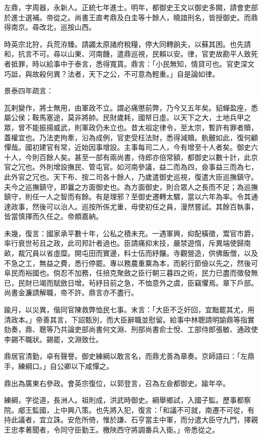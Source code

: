 \begin{pinyinscope}
左鼎，字周器，永新人。正統七年進士。明年，都御史王文以御史多闕，請會吏部於進士選補。帝從之。尚書王直考鼎及白圭等十餘人，曉諳刑名，皆授御史。而鼎得南京。尋改北，巡按山西。

時英宗北狩，兵荒洊臻。請蠲太原諸府稅糧，停大同轉餉夫，以蘇其困。也先請和，抗言不可。尋以山東、河南饑，遣鼎巡視，民賴以安。律，官吏故勘平人致死者抵罪，時以給事中于泰言，悉得寬貰。鼎言：「小民無知，情貸可也。官吏深文巧詆，與故殺何異？法者，天下之公，不可意為輕重。」自是論如律。

景泰四年疏言：

瓦剌變作，將士無用，由軍政不立。謂必痛懲前弊，乃今又五年矣。貂蟬盈座，悉屬公侯；鞍馬塞途，莫非將帥。民財歲耗，國帑日虛。以天下之大，土地兵甲之眾，曾不能振揚威武，則軍政仍未立也。昔太祖定律令，至太宗，暫許有罪者贖，蓋權宜也。乃法吏拘牽，沿為成例，官吏受枉法財，悉得減贖。骫骳如此，復何顧憚哉。國初建官有常，近始因事增設。主事每司二人，今有增至十人者矣。御史六十人，今則百餘人矣。甚至一部有兩尚書，侍郎亦倍常額，都御史以數十計，此京官之冗也。外則增設撫民、管屯官。如河南參議，益二而為四，僉事益三而為七，此外官之冗也。天下布、按二司各十餘人，乃歲遣御史巡視，復遣大臣巡撫鎮守。夫今之巡撫鎮守，即曩之方面御史也。為方面御史，則合眾人之長而不足；為巡撫鎮守，則任一人之智而有餘。有是理邪？至御史遷轉太驟，當以六年為率。令其通達政事，然後可以治人。巡按所係尤重，毋使初任之員，漫然嘗試。其餘百執事，皆當慎擇而久任之。帝頗嘉納。

未幾，復言：國家承平數十年，公私之積未充。一遇軍興，抑配橫徵，鬻官市爵，率行衰世茍且之政，此司邦計者過也。臣請痛抑末技，嚴禁遊惰，斥異端使歸南畝，裁冗員以省虛糜。開屯田而實邊，料士伍而紓饟。寺觀營造，供佛飯僧，以及不急之工，無益之費，悉行停罷。專以務農重粟為本，而躬行節儉以先之，然後可阜民而裕國也。倘忍不加務，任掊克聚斂之臣行朝三暮四之術，民力已盡而徵發無已，民財已竭而賦斂日增。茍紓目前之急，不恤意外之虞，臣竊懼焉。章下戶部。尚書金濂請解職，帝不許。鼎言亦不盡行。

踰月，以災異，偕同官陳救弊恤民七事。末言：「大臣不乏奸回，宜黜罷其尤，用清政本。」帝善其言，下詔甄別，而大臣辭職並慰留。給事中林聰請明諭鼎等指實劾奏，鼎、聰等乃共論吏部尚書何文淵、刑部尚書俞士悅、工部侍郎張敏、通政使李錫不職狀。錫罷，文淵致仕。

鼎居官清勤，卓有聲譽。御史練綱以敢言名，而鼎尤善為章奏。京師語曰：「左鼎手，練綱口。」自公卿以下咸憚之。

鼎出為廣東右參政。會英宗復位，以郭登言，召為左僉都御史。踰年卒。

練綱，字從道，長洲人。祖則成，洪武時御史。綱舉鄉試，入國子監。歷事都察院。郕王監國，上中興八策。也先將入犯，復言：「和議不可就，南遷不可從，有持此議者，宜立誅。安危所倚，惟於謙、石亨當主中軍，而分遣大臣守九門，擇親王忠孝著聞者，令同守臣勤王。檄陜西守將調番兵入衛。」帝悉從之。


\end{pinyinscope}

